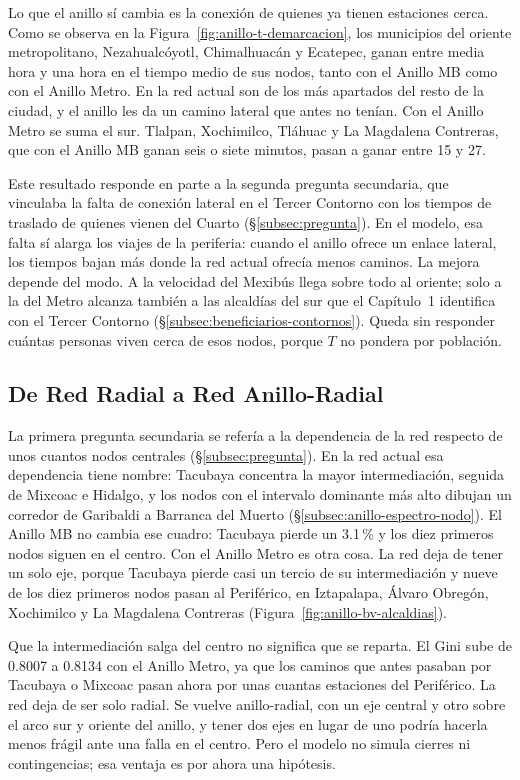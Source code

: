 Lo que el anillo sí cambia es la conexión de quienes ya tienen estaciones cerca.
Como se observa en la Figura~\ref{fig:anillo-t-demarcacion}, los municipios del
oriente metropolitano, Nezahualcóyotl, Chimalhuacán y Ecatepec, ganan entre
media hora y una hora en el tiempo medio de sus nodos, tanto con el Anillo MB
como con el Anillo Metro. En la red actual son de los más apartados del resto de
la ciudad, y el anillo les da un camino lateral que antes no tenían. Con el
Anillo Metro se suma el sur. Tlalpan, Xochimilco, Tláhuac y La Magdalena
Contreras, que con el Anillo MB ganan seis o siete minutos, pasan a ganar entre
15 y 27.

Este resultado responde en parte a la segunda pregunta secundaria, que
vinculaba la falta de conexión lateral en el Tercer Contorno con los tiempos de
traslado de quienes vienen del Cuarto (§\ref{subsec:pregunta}). En el modelo,
esa falta sí alarga los viajes de la periferia: cuando el anillo ofrece un
enlace lateral, los tiempos bajan más donde la red actual ofrecía menos
caminos. La mejora depende del modo. A la velocidad del Mexibús llega sobre todo
al oriente; solo a la del Metro alcanza también a las alcaldías del sur que el
Capítulo~1 identifica con el Tercer Contorno (§\ref{subsec:beneficiarios-contornos}).
Queda sin responder cuántas personas viven cerca de esos nodos, porque $T$ no
pondera por población.

\subsection{De Red Radial a Red Anillo-Radial}
\label{subsec:anillo-conclusiones-centralidad}

La primera pregunta secundaria se refería a la dependencia de la red respecto de
unos cuantos nodos centrales (§\ref{subsec:pregunta}). En la red actual esa
dependencia tiene nombre: Tacubaya concentra la mayor intermediación, seguida de
Mixcoac e Hidalgo, y los nodos con el intervalo dominante más alto dibujan un
corredor de Garibaldi a Barranca del Muerto (§\ref{subsec:anillo-espectro-nodo}).
El Anillo MB no cambia ese cuadro: Tacubaya pierde un 3.1\,\% y los diez
primeros nodos siguen en el centro. Con el Anillo Metro es otra cosa. La red
deja de tener un solo eje, porque Tacubaya pierde casi un tercio de su
intermediación y nueve de los diez primeros nodos pasan al Periférico, en
Iztapalapa, Álvaro Obregón, Xochimilco y La Magdalena Contreras
(Figura~\ref{fig:anillo-bv-alcaldias}).

Que la intermediación salga del centro no significa que se reparta. El Gini sube
de 0.8007 a 0.8134 con el Anillo Metro, ya que los caminos que antes pasaban por
Tacubaya o Mixcoac pasan ahora por unas cuantas estaciones del Periférico. La
red deja de ser solo radial. Se vuelve anillo-radial, con un eje central y otro
sobre el arco sur y oriente del anillo, y tener dos ejes en lugar de uno podría
hacerla menos frágil ante una falla en el centro. Pero el modelo no simula
cierres ni contingencias; esa ventaja es por ahora una hipótesis.

